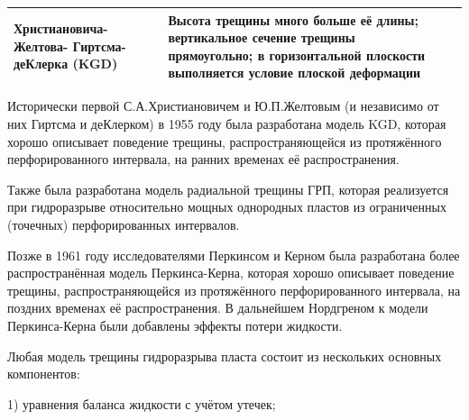 \begin{longtable}[l]{|L{2.8cm}|L{6.7cm}|L{6.2cm}|}
	Христиановича- Желтова- Гиртсма- деКлерка (KGD)&Высота трещины много больше её длины; вертикальное сечение трещины прямоугольно; в горизонтальной плоскости выполняется условие плоской деформации&\hfill\break{}\\ \hline
	
\end{longtable}
\normalsize%
\endgroup

Исторически первой С.А.Христиановичем и Ю.П.Желтовым (и независимо от них Гиртсма и деКлерком) в 1955 году была разработана модель KGD, которая хорошо описывает поведение трещины, распространяющейся из протяжённого перфорированного интервала, на ранних временах её распространения.

Также была разработана модель радиальной трещины ГРП, которая реализуется при гидроразрыве относительно мощных однородных пластов из ограниченных (точечных) перфорированных интервалов.

Позже в 1961 году исследователями Перкинсом и Керном была разработана более распространённая модель Перкинса-Керна, которая хорошо описывает поведение трещины, распространяющейся из протяжённого перфорированного интервала, на поздних временах её распространения.
В дальнейшем Нордгреном к модели Перкинса-Керна были добавлены эффекты потери жидкости.

Любая модель трещины гидроразрыва пласта состоит из нескольких основных компонентов:

1) уравнения баланса жидкости с учётом утечек;

